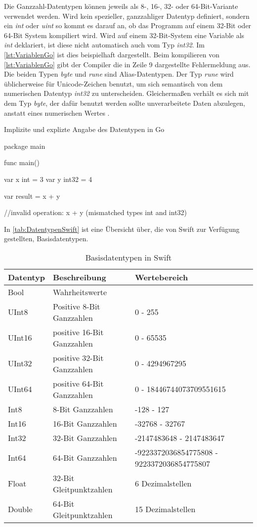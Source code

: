 Die Ganzzahl-Datentypen können jeweils als 8-, 16-, 32- oder 64-Bit-Variante verwendet werden. 
Wird kein spezieller, ganzzahliger Datentyp definiert, sondern ein \emph{int} oder \emph{uint} so kommt es darauf an, ob das Programm auf einem 32-Bit oder 64-Bit System kompiliert wird.
Wird auf einem 32-Bit-System eine Variable als \emph{int} deklariert, ist diese  nicht automatisch auch vom Typ \emph{int32}.
Im \autoref{lst:VariablenGo} ist dies beispielhaft dargestellt. 
Beim kompilieren von \autoref{lst:VariablenGo} gibt der Compiler die in Zeile 9 dargestellte Fehlermeldung aus. 
Die beiden Typen \emph{byte} und \emph{rune} sind Alias-Datentypen.
Der Typ \emph{rune} wird üblicherweise für Unicode-Zeichen benutzt, um sich semantisch von dem numerischen Datentyp \emph{int32} zu unterscheiden. 
Gleichermaßen verhält es sich mit dem Typ \emph{byte}, der dafür benutzt werden sollte unverarbeitete Daten abzulegen, anstatt eines numerischen Wertes \cite[S.98]{Kennedy.2016}.

\begin{listing}[H]
\caption{Implizite und explizte Angabe des Datentypen in Go}
\label{lst:VariablenGo}
\begin{GoCode}
package main

func main() {
    var x int = 3
    var y int32 = 4

    var result = x + y	
}
//invalid operation: x + y (mismatched types int and int32)
\end{GoCode}
\end{listing}

In \autoref{tab:DatentypenSwift} ist eine Übersicht über, die von Swift zur Verfügung gestellten, Basisdatentypen. 

\begin{table}[h]
\centering
\begin{tabularx}{\textwidth}{|l|X|X|}
 \hline 
 \rowcolor[gray]{0.75} \textbf{Datentyp} & \textbf{Beschreibung} & \textbf{Wertebereich} \\
 \hline
 Bool & Wahrheitswerte & \\ 
 \hline 
 UInt8 & Positive 8-Bit Ganzzahlen & 0 - 255\\
 \hline 
 UInt16	& positive 16-Bit Ganzzahlen & 0 - 65535\\
 \hline
 UInt32 & positive 32-Bit Ganzzahlen & 0 - 4294967295\\
 \hline
 UInt64	& positive 64-Bit Ganzzahlen & 0 - 18446744073709551615\\
 \hline
 Int8 & 8-Bit Ganzzahlen & -128 - 127 \\
 \hline
 Int16 & 16-Bit Ganzzahlen & -32768 - 32767 \\
 \hline
 Int32 & 32-Bit Ganzzahlen & -2147483648 - 2147483647 \\
 \hline
 Int64 & 64-Bit Ganzzahlen & -9223372036854775808 - 9223372036854775807 \\
 \hline
 Float & 32-Bit Gleitpunktzahlen & 6 Dezimalstellen \\
 \hline 
 Double & 64-Bit Gleitpunktzahlen & 15 Dezimalstellen \\
 \hline
\end{tabularx}
\caption{Basisdatentypen in Swift}
\label{tab:DatentypenSwift}
\end{table}

